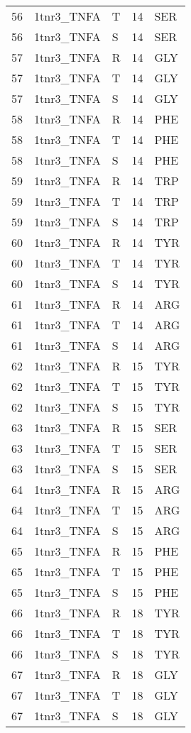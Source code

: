 \begin{tiny}
\begin{longtable}[l]{l|l|l|l|l}
	56 & 1tnr3\_TNFA & T & 14 & SER \\
	56 & 1tnr3\_TNFA & S & 14 & SER \\
	57 & 1tnr3\_TNFA & R & 14 & GLY \\
	57 & 1tnr3\_TNFA & T & 14 & GLY \\
	57 & 1tnr3\_TNFA & S & 14 & GLY \\
	58 & 1tnr3\_TNFA & R & 14 & PHE \\
	58 & 1tnr3\_TNFA & T & 14 & PHE \\
	58 & 1tnr3\_TNFA & S & 14 & PHE \\
	59 & 1tnr3\_TNFA & R & 14 & TRP \\
	59 & 1tnr3\_TNFA & T & 14 & TRP \\
	59 & 1tnr3\_TNFA & S & 14 & TRP \\
	60 & 1tnr3\_TNFA & R & 14 & TYR \\
	60 & 1tnr3\_TNFA & T & 14 & TYR \\
	60 & 1tnr3\_TNFA & S & 14 & TYR \\
	61 & 1tnr3\_TNFA & R & 14 & ARG \\
	61 & 1tnr3\_TNFA & T & 14 & ARG \\
	61 & 1tnr3\_TNFA & S & 14 & ARG \\
	62 & 1tnr3\_TNFA & R & 15 & TYR \\
	62 & 1tnr3\_TNFA & T & 15 & TYR \\
	62 & 1tnr3\_TNFA & S & 15 & TYR \\
	63 & 1tnr3\_TNFA & R & 15 & SER \\
	63 & 1tnr3\_TNFA & T & 15 & SER \\
	63 & 1tnr3\_TNFA & S & 15 & SER \\
	64 & 1tnr3\_TNFA & R & 15 & ARG \\
	64 & 1tnr3\_TNFA & T & 15 & ARG \\
	64 & 1tnr3\_TNFA & S & 15 & ARG \\
	65 & 1tnr3\_TNFA & R & 15 & PHE \\
	65 & 1tnr3\_TNFA & T & 15 & PHE \\
	65 & 1tnr3\_TNFA & S & 15 & PHE \\
	66 & 1tnr3\_TNFA & R & 18 & TYR \\
	66 & 1tnr3\_TNFA & T & 18 & TYR \\
	66 & 1tnr3\_TNFA & S & 18 & TYR \\
	67 & 1tnr3\_TNFA & R & 18 & GLY \\
	67 & 1tnr3\_TNFA & T & 18 & GLY \\
	67 & 1tnr3\_TNFA & S & 18 & GLY \\

\end{longtable}
\end{tiny}
